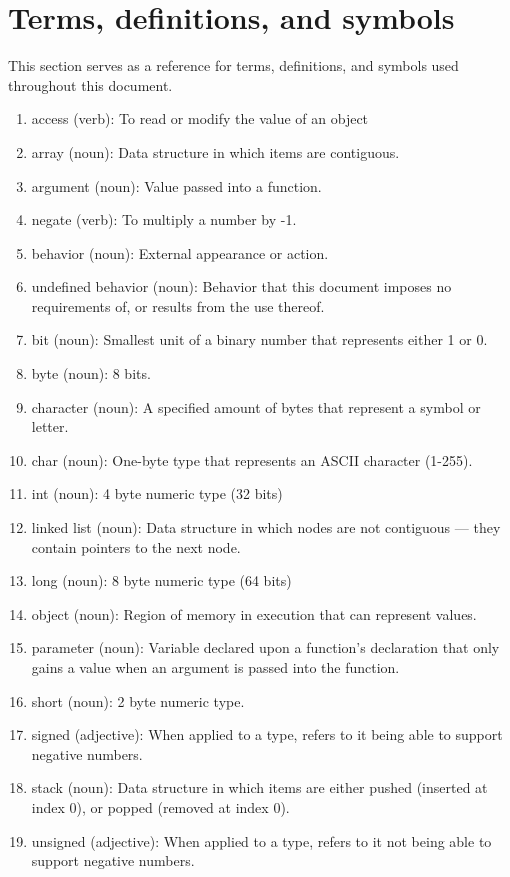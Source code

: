 \documentclass[12pt, letterpaper, oneside]{article}
\begin{document}
	\section{Terms, definitions, and symbols}
	This section serves as a reference for terms, definitions, and symbols used throughout this document.
	\begin{enumerate}
		\item access (verb): To read or modify the value of an object
		\item array (noun): Data structure in which items are contiguous.
		\item argument (noun): Value passed into a function.
		\item negate (verb): To multiply a number by -1.
		\item behavior (noun): External appearance or action.
		\item undefined behavior (noun): Behavior that this document imposes no requirements of, or results from the use thereof.
		\item bit (noun): Smallest unit of a binary number that represents either 1 or 0.
		\item byte (noun): 8 bits.
		\item character (noun): A specified amount of bytes that represent a symbol or letter.
		\item char (noun): One-byte type that represents an ASCII character (1-255).
		\item int (noun): 4 byte numeric type (32 bits)
		\item linked list (noun): Data structure in which nodes are not contiguous --- they contain pointers to the next node.
		\item long (noun): 8 byte numeric type (64 bits)
		\item object (noun): Region of memory in execution that can represent values.
		\item parameter (noun): Variable declared upon a function's declaration that only gains a value when an argument is passed into the function.
		\item short (noun): 2 byte numeric type.
		\item signed (adjective): When applied to a type, refers to it being able to support negative numbers.
		\item stack (noun): Data structure in which items are either pushed (inserted at index 0), or popped (removed at index 0).
		\item unsigned (adjective): When applied to a type, refers to it not being able to support negative numbers.

\end{enumerate}
\end{document}
